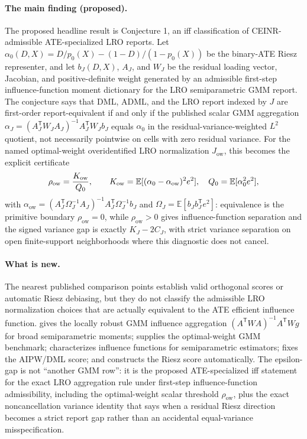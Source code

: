\documentclass[11pt]{article}
\newcommand{\E}{\mathbb{E}}
\newcommand{\transpose}{\mathsf{T}}
\theoremstyle{definition}
\theoremstyle{plain}
\theoremstyle{remark}
\begin{document}
\paragraph{The main finding (proposed).}
The proposed headline result is Conjecture 1, an iff classification of CEINR-admissible ATE-specialized LRO reports.  Let $\alpha_0(D,X)=D/p_0(X)-(1-D)/(1-p_0(X))$ be the binary-ATE Riesz representer, and let $b_J(D,X)$, $A_J$, and $W_J$ be the residual loading vector, Jacobian, and positive-definite weight generated by an admissible first-step influence-function moment dictionary for the LRO semiparametric GMM report.  The conjecture says that DML, ADML, and the LRO report indexed by $J$ are first-order report-equivalent if and only if the published scalar GMM aggregation $\alpha_J=(A_J^\transpose W_JA_J)^{-1}A_J^\transpose W_Jb_J$ equals $\alpha_0$ in the residual-variance-weighted $L^2$ quotient, not necessarily pointwise on cells with zero residual variance.  For the named optimal-weight overidentified LRO normalization $J_{\mathrm{ow}}$, this becomes the explicit certificate
\[
  \rho_{\mathrm{ow}}={K_{\mathrm{ow}}\over Q_0},\qquad
  K_{\mathrm{ow}}=\E[(\alpha_0-\alpha_{\mathrm{ow}})^2e^2],\quad
  Q_0=\E[\alpha_0^2e^2],
\]
with $\alpha_{\mathrm{ow}}=(A_J^\transpose\Omega_J^{-1}A_J)^{-1}A_J^\transpose\Omega_J^{-1}b_J$ and $\Omega_J=\E[b_Jb_J^\transpose e^2]$: equivalence is the primitive boundary $\rho_{\mathrm{ow}}=0$, while $\rho_{\mathrm{ow}}>0$ gives influence-function separation and the signed variance gap is exactly $K_J-2C_J$, with strict variance separation on open finite-support neighborhoods where this diagnostic does not cancel.

\paragraph{What is new.}
The nearest published comparison points establish valid orthogonal scores or automatic Riesz debiasing, but they do not classify the admissible LRO normalization choices that are actually equivalent to the ATE efficient influence function.  \citet{ChernozhukovEscancianoIchimuraNeweyRobins2022LRO} gives the locally robust GMM influence aggregation $(A^\transpose W A)^{-1}A^\transpose Wg$ for broad semiparametric moments; \citet{Hansen1982Econometrica} supplies the optimal-weight GMM benchmark; \citet{IchimuraNewey2022QE} characterizes influence functions for semiparametric estimators; \citet{ChernozhukovEtAl2018ECTJ} fixes the AIPW/DML score; and \citet{ChernozhukovNeweySingh2022ADML} constructs the Riesz score automatically.  The epsilon-gap is not ``another GMM row'': it is the proposed ATE-specialized iff statement for the exact LRO aggregation rule under first-step influence-function admissibility, including the optimal-weight scalar threshold $\rho_{\mathrm{ow}}$, plus the exact noncancellation variance identity that says when a residual Riesz direction becomes a strict report gap rather than an accidental equal-variance misspecification.
\end{document}
